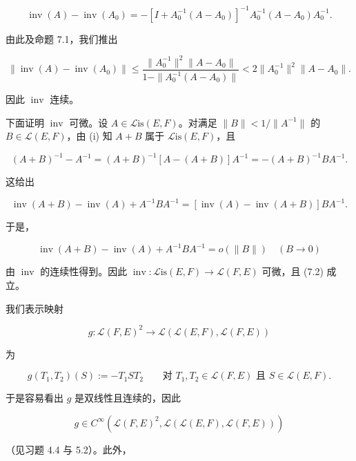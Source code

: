\begin{proposition}
\begin{subitems}
\begin{equation}
\operatorname{inv}(A) - \operatorname{inv}(A_{0}) = -\left[I + A_{0}^{-1}(A - A_{0})\right]^{-1}A_{0}^{-1}(A - A_{0})A_{0}^{-1} .\tag{7.4}
\end{equation}

由此及命题 7.1，我们推出

\begin{equation}
\|\operatorname{inv}(A) - \operatorname{inv}(A_{0})\| \le \frac{\|A_{0}^{-1}\|^{2}\|A - A_{0}\|}{1 - \|A_{0}^{-1}(A - A_{0})\|} < 2\|A_{0}^{-1}\|^{2}\|A - A_{0}\| .\tag{7.5}
\end{equation}

因此 $ \operatorname{inv} $ 连续。

\item[（iii）]

下面证明 $ \operatorname{inv} $ 可微。设 $ A \in \mathcal{L}\mathrm{is}(E, F) $。对满足 $ \|B\| < 1/\|A^{-1}\| $ 的 $ B \in \mathcal{L}(E, F) $，由 (i) 知 $ A + B $ 属于 $ \mathcal{L}\mathrm{is}(E, F) $，且

\[
(A + B)^{-1} - A^{-1} = (A + B)^{-1}\left[A - (A + B)\right]A^{-1} = -(A + B)^{-1}BA^{-1} .
\]

这给出

\[
\operatorname{inv}(A + B) - \operatorname{inv}(A) + A^{-1}BA^{-1} = \left[\operatorname{inv}(A) - \operatorname{inv}(A + B)\right]BA^{-1} .
\]

于是，

\[
\operatorname{inv}(A + B) - \operatorname{inv}(A) + A^{-1}BA^{-1} = o(\|B\|) \quad (B \to 0)
\]

由 $ \operatorname{inv} $ 的连续性得到。因此 $ \operatorname{inv} : \mathcal{L}\mathrm{is}(E, F) \to \mathcal{L}(F, E) $ 可微，且 (7.2) 成立。

\item[（iv）]

我们表示映射

\[
g : \mathcal{L}(F, E)^{2} \to \mathcal{L}\left(\mathcal{L}(E, F), \mathcal{L}(F, E)\right)
\]

为

\[
g(T_{1}, T_{2})(S) := -T_{1}ST_{2} \qquad \text{对 } T_{1}, T_{2} \in \mathcal{L}(F, E) \text{ 且 } S \in \mathcal{L}(E, F) .
\]

于是容易看出 $ g $ 是双线性且连续的，因此

\[
g \in C^{\infty}\left(\mathcal{L}(F, E)^{2}, \mathcal{L}\left(\mathcal{L}(E, F), \mathcal{L}(F, E)\right)\right)
\]

（见习题 4.4 与 5.2）。此外，


\end{subitems}
\end{proposition}
